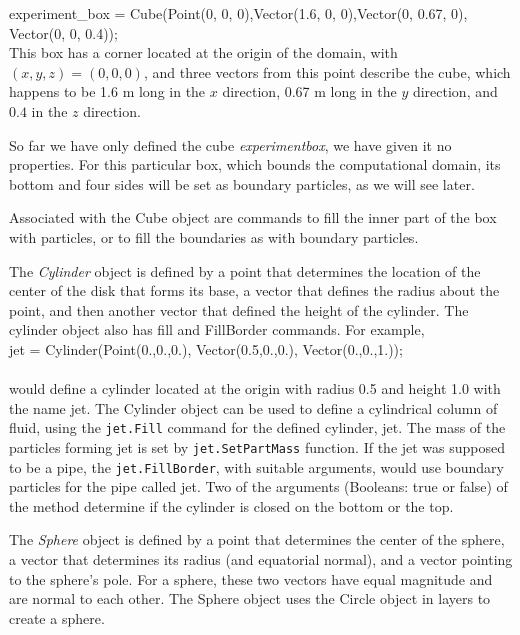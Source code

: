 \documentclass{../GPUSPHtemplate}
\begin{document}
\noindent experiment\_box = Cube(Point(0, 0, 0),Vector(1.6, 0,
0),Vector(0, 0.67, 0), Vector(0, 0, 0.4));\\

This box has a corner located at the origin of the domain, with $(x, y,
z) = (0,0,0)$, and three vectors from this point describe the cube,
which happens to be 1.6 m long in the $x$ direction, 0.67 m long in the
$y$ direction, and $0.4$ in the $z$ direction.

So far we have only defined the cube {\em experiment\-box}, we have
given it no properties. For this particular box, which bounds the
computational domain, its bottom and four sides will be set as boundary
particles, as we will see later.

Associated with the Cube object are commands to fill the inner part of
the box with particles, or to fill the boundaries as with boundary
particles. %


The {\em Cylinder} object is defined by a point that determines the
location of the center of the disk that forms its base, a vector that
defines the radius about the point, and then another vector that defined
the height of the cylinder. The cylinder object also has fill and
FillBorder commands. For example, \\

jet = Cylinder(Point(0.,0.,0.), Vector(0.5,0.,0.), Vector(0.,0.,1.));\\
\\would define a cylinder located at the origin with radius 0.5 and
height 1.0 with the name jet. The Cylinder object can be used to
define a cylindrical column of fluid, using the \verb!jet.Fill!
command for the defined cylinder, jet. The mass of the particles
forming jet is set by \verb!jet.SetPartMass! function. If the jet was
supposed to be a pipe, the \verb!jet.FillBorder!, with suitable
arguments, would use boundary particles for the pipe called jet. Two
of the arguments (Booleans: true or false) of the method determine if
the cylinder is closed on the bottom or the top.


The {\em Sphere} object is defined by a point that determines the center
of the sphere, a vector that determines its radius (and equatorial
normal), and a vector pointing to the sphere's pole. For a sphere,
these two vectors have equal magnitude and are normal to each other.
The Sphere object uses the Circle object in layers to create a sphere.
\end{document}
